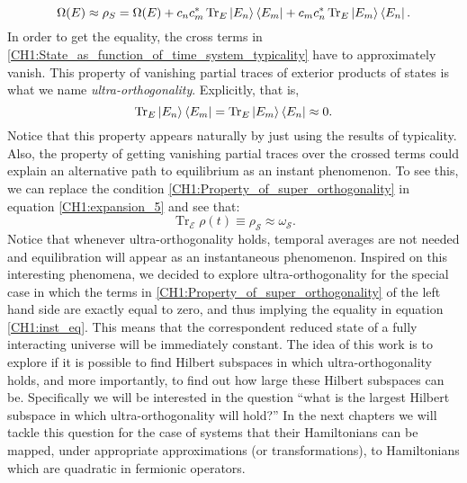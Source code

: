 \begin{equation}
\Omega(E) \approx\rho_S= \Omega(E) + c_n c^{*}_m  \operatorname{Tr}_E \mathinner{|{E_n}\rangle}\mathinner{\langle{E_m}|} + c_m c^{*}_n \operatorname{Tr}_E \mathinner{|{E_m}\rangle}\mathinner{\langle{E_n}|}.
\label{CH1:State_as_function_of_time_system_typicality}
\end{equation}
In order to get the equality, the cross terms in \eqref{CH1:State_as_function_of_time_system_typicality} have to  approximately vanish. This property of vanishing partial traces of exterior products of states is what we name \textit{ultra-orthogonality}. Explicitly, that is,
\begin{equation}
\operatorname{Tr}_E \mathinner{|{E_n}\rangle}\mathinner{\langle{E_m}|} = \operatorname{Tr}_E \mathinner{|{E_m}\rangle}\mathinner{\langle{E_n}|} \approx  0.
\label{CH1:Property_of_super_orthogonality}
\end{equation}
Notice that this property appears naturally by just using the results of typicality. Also, the property of getting vanishing partial traces over the crossed terms could explain an alternative path to equilibrium as an instant phenomenon. To see this, we can replace the condition \eqref{CH1:Property_of_super_orthogonality} in equation \eqref{CH1:expansion_5} and see that:
\begin{equation}
\operatorname{Tr}_{\mathcal{E}}\rho(t)\equiv \rho_{\mathcal{S}} \approx \omega_{\mathcal{S}}.
\label{CH1:inst_eq}
\end{equation}
Notice that whenever ultra-orthogonality holds, temporal averages are not needed and equilibration will appear as an instantaneous phenomenon. Inspired on this interesting phenomena, we decided to explore ultra-orthogonality for the special case in which the terms in \eqref{CH1:Property_of_super_orthogonality} of the left hand side are exactly equal to zero, and thus implying the equality in equation \eqref{CH1:inst_eq}. This means that the correspondent reduced state of a fully interacting universe will be immediately constant. The idea of this work is to explore if it is possible to find Hilbert subspaces in which ultra-orthogonality holds, and more importantly, to find out how large these Hilbert subspaces can be. Specifically we will be interested in the question ``what is the largest Hilbert subspace in which ultra-orthogonality will hold?'' In the next chapters we will tackle this question for the case of systems that their Hamiltonians can be mapped, under appropriate approximations (or transformations), to Hamiltonians which are quadratic in fermionic operators.


